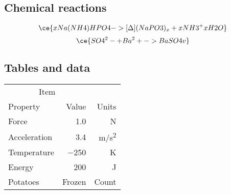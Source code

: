 \subsection*{Chemical reactions}
%
\[ \ce{x Na(NH4)HPO4 ->[\Delta] (NaPO3)_x + x NH3 ^ + x H2O} \]
\[ \ce{SO4^2- + Ba^2+ -> BaSO4 v} \]

\subsection*{Tables and data}

\begin{tabular}{lrr}  
\toprule
\multicolumn{2}{c}{Item} \\
\cmidrule(r){1-2}
Property        & Value         & Units         \\ \midrule
Force           & \num{1.0}     & \si{N}        \\
Acceleration    & \num{3.4}     & \si{m/s^2}    \\
Temperature     & \num{-250}    & \si{K}        \\
Energy          & \num{200}     & \si{J}    \\
Potatoes        & Frozen        & Count         \\
\bottomrule
\end{tabular}
